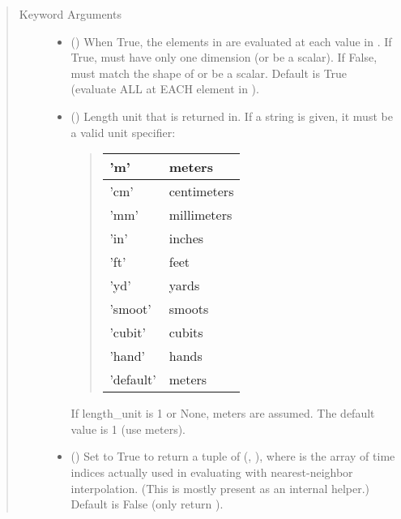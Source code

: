\documentclass[letterpaper,10pt,english]{sphinxmanual}
\begin{document}
\begin{fulllineitems}
\begin{fulllineitems}
\begin{quote}
\begin{description}
\item[{Keyword Arguments}] \leavevmode\begin{itemize}
\item {} 
 () \textendash{} When True, the elements in  are evaluated
at each value in . If True,  must have only one dimension
(or be a scalar). If False,  must match the shape of 
or be a scalar. Default is True (evaluate ALL  at EACH
element in ).

\item {} 
 () \textendash{} 
Length unit that  is returned in.
If a string is given, it must be a valid unit specifier:
\begin{quote}


\begin{savenotes}\sphinxattablestart
\centering
\begin{tabulary}{\linewidth}[t]{|T|T|}
\hline

’m’
&
meters
\\
\hline
’cm’
&
centimeters
\\
\hline
’mm’
&
millimeters
\\
\hline
’in’
&
inches
\\
\hline
’ft’
&
feet
\\
\hline
’yd’
&
yards
\\
\hline
’smoot’
&
smoots
\\
\hline
’cubit’
&
cubits
\\
\hline
’hand’
&
hands
\\
\hline
’default’
&
meters
\\
\hline
\end{tabulary}
\par
\sphinxattableend\end{savenotes}
\end{quote}

If length\_unit is 1 or None, meters are assumed. The default
value is 1 (use meters).


\item {} 
 () \textendash{} Set to True to return a tuple of (,
), where  is the array of time indices
actually used in evaluating  with nearest-neighbor
interpolation. (This is mostly present as an internal helper.)
Default is False (only return ).


\end{itemize}
\end{description}
\end{quote}
\end{fulllineitems}
\end{fulllineitems}
\end{document}
